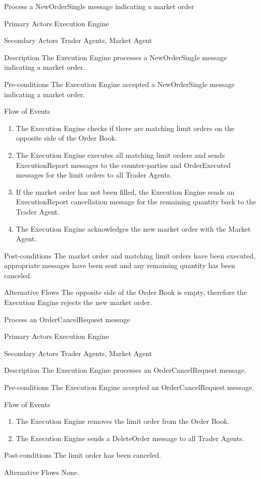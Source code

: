 \begin{usecase}{Process a NewOrderSingle message indicating a market order}
\item[Primary Actors] Execution Engine
\item[Secondary Actors] Trader Agents, Market Agent
\item[Description] The Execution Engine processes a NewOrderSingle message indicating a market order.
\item[Pre-conditions] The Execution Engine accepted a NewOrderSingle message indicating a market order.
\item[Flow of Events] 
\begin{enumerate}
\item The Execution Engine checks if there are matching limit orders on the opposite side of the Order Book.
\item The Execution Engine executes all matching limit orders and sends ExecutionReport messages to the counter-parties and OrderExecuted messages for the limit orders to all Trader Agents.
\item If the market order has not been filled, the Execution Engine sends an ExecutionReport cancellation message for the remaining quantity back to the Trader Agent.
\item The Execution Engine acknowledges the new market order with the Market Agent.
\end{enumerate}
\item[Post-conditions] The market order and matching limit orders have been executed, appropriate messages have been sent and any remaining quantity has been canceled.
\item[Alternative Flows] The opposite side of the Order Book is empty, therefore the Execution Engine rejects the new market order.
\end{usecase}

\begin{usecase}{Process an OrderCancelRequest message}
\item[Primary Actors] Execution Engine
\item[Secondary Actors] Trader Agents, Market Agent
\item[Description] The Execution Engine processes an OrderCancelRequest message.
\item[Pre-conditions] The Execution Engine accepted an OrderCancelRequest message. 
\item[Flow of Events] 
\begin{enumerate}
\item The Execution Engine removes the limit order from the Order Book.
\item The Execution Engine sends a DeleteOrder message to all Trader Agents.
\end{enumerate}
\item[Post-conditions] The limit order has been canceled.
\item[Alternative Flows] None.
\end{usecase}

